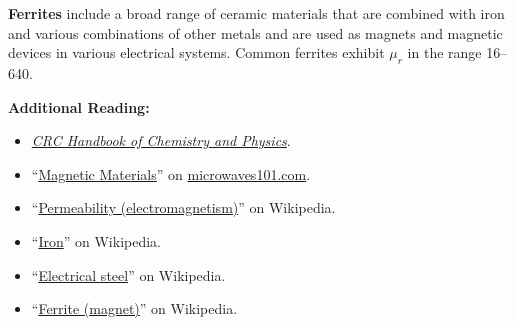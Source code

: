 {\bf Ferrites} 
include a broad range of ceramic materials that are combined with iron and various combinations of other metals and are used as magnets and magnetic devices in various  electrical systems. Common ferrites exhibit $\mu_r$ in the range 16--640.


{\bf Additional Reading:}
\begin{itemize}
\item \href{http://hbcponline.com}{\emph{CRC Handbook of Chemistry and Physics}}.
\item ``\href{https://www.microwaves101.com/encyclopedias/magnetic-materials}{Magnetic Materials}'' on \href{http://www.microwaves101.com}{microwaves101.com}.
\item ``\href{https://en.wikipedia.org/wiki/Permeability_(electromagnetism)}{Permeability (electromagnetism)}'' on Wikipedia.
\item ``\href{https://en.wikipedia.org/wiki/Iron}{Iron}'' on Wikipedia.
\item ``\href{https://en.wikipedia.org/wiki/Electrical_steel}{Electrical steel}'' on Wikipedia.
\item ``\href{https://en.wikipedia.org/wiki/Ferrite_(magnet)}{Ferrite (magnet)}'' on Wikipedia.
\end{itemize}

